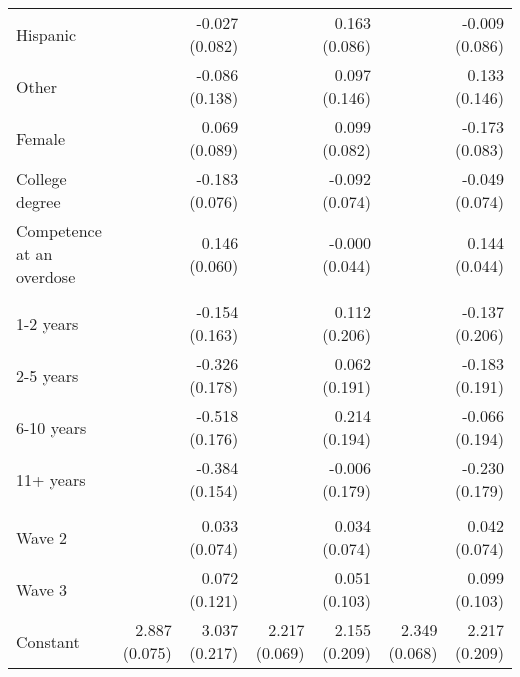 \begin{table}[htbp]
\begin{adjustbox}{max width=\linewidth}
\begin{tabular}{l*{6}{D{.}{.}{-1}}}
Hispanic        &                  &-0.027 (0.082)         &                  &0.163 (0.086)         &                  &-0.009 (0.086)         \\
Other           &                  &-0.086 (0.138)         &                  &0.097 (0.146)         &                  &0.133 (0.146)         \\
Female          &                  &0.069 (0.089)         &                  &0.099 (0.082)         &                  &-0.173\sym{*} (0.083)         \\
College degree  &                  &-0.183\sym{*} (0.076)         &                  &-0.092 (0.074)         &                  &-0.049 (0.074)         \\
Competence at an overdose&                  &0.146\sym{*} (0.060)         &                  &-0.000 (0.044)         &                  &0.144\sym{**} (0.044)         \\
&                  &                  &                  &                  &                  &                  \\
1-2 years       &                  &-0.154 (0.163)         &                  &0.112 (0.206)         &                  &-0.137 (0.206)         \\
2-5 years       &                  &-0.326 (0.178)         &                  &0.062 (0.191)         &                  &-0.183 (0.191)         \\
6-10 years      &                  &-0.518\sym{**} (0.176)         &                  &0.214 (0.194)         &                  &-0.066 (0.194)         \\
11+ years       &                  &-0.384\sym{*} (0.154)         &                  &-0.006 (0.179)         &                  &-0.230 (0.179)         \\
      &                  &                  &                  &                  &                  &                  \\
Wave 2          &                  &0.033 (0.074)         &                  &0.034 (0.074)         &                  &0.042 (0.074)         \\
Wave 3          &                  &0.072 (0.121)         &                  &0.051 (0.103)         &                  &0.099 (0.103)         \\
Constant        &2.887\sym{***} (0.075)         &3.037\sym{***} (0.217)         &2.217\sym{***} (0.069)         &2.155\sym{***} (0.209)         &2.349\sym{***} (0.068)         &2.217\sym{***} (0.209)         \\

\end{tabular}
\end{adjustbox}
\end{table}
